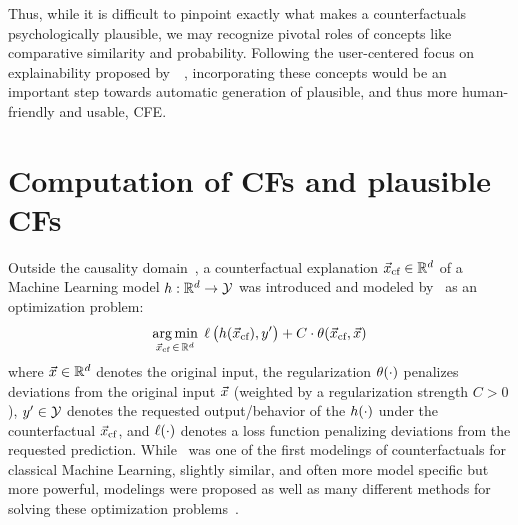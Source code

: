Thus, while it is difficult to pinpoint exactly what makes a counterfactuals psychologically plausible, we may recognize pivotal roles of concepts like comparative similarity and probability.
Following the user-centered focus on explainability proposed by~\citeauthor{miller_explanation_2019}~\citep{miller_explanation_2019}, incorporating these concepts would be an important step towards automatic generation of plausible, and thus more human-friendly and usable, \gls{CFE}.

\section{Computation of CFs and plausible CFs}\label{sec:EffCompCFs}
Outside the causality domain~\citep{halpern_causes_2020,karimi_survey_2020}, a counterfactual explanation ${\vec{x}_{\text{cf}}}\in\mathbb{R}^d$ of a Machine Learning model $h:\mathbb{R}^d\to\mathcal{Y}$ was introduced and modeled by~\citep{wachter_counterfactual_2017} as an optimization problem:
\begin{equation}\label{eq:counterfactual_opt_original}
\underset{{\vec{x}_{\text{cf}}} \,\in\, \mathbb{R}^d}{\arg\min}\; \operatorname*{{\ell}}\big(h({\vec{x}_{\text{cf}}}), y'\big) + C \cdot \operatorname*{{\theta}}({\vec{x}_{\text{cf}}}, \vec{x})
\end{equation}
where $\vec{x}\in\mathbb{R}^d$ denotes the original input, the regularization $\operatorname*{{\theta}}(\cdot)$ penalizes deviations from the original input $\vec{x}$ (weighted by a regularization strength $C>0$), $y'\in\mathcal{Y}$ denotes the requested output/behavior of the $h(\cdot)$ under the counterfactual ${\vec{x}_{\text{cf}}}$, and $\operatorname*{{\ell}}(\cdot)$ denotes a loss function penalizing deviations from the requested prediction.
While~ was one of the first modelings of counterfactuals for classical Machine Learning, slightly similar, and often more model specific but more powerful, modelings were proposed as well as many different methods for solving these optimization problems~\citep{verma_counterfactual_2020,artelt_counterfactuals_survey_2019,karimi_survey_2020}.

